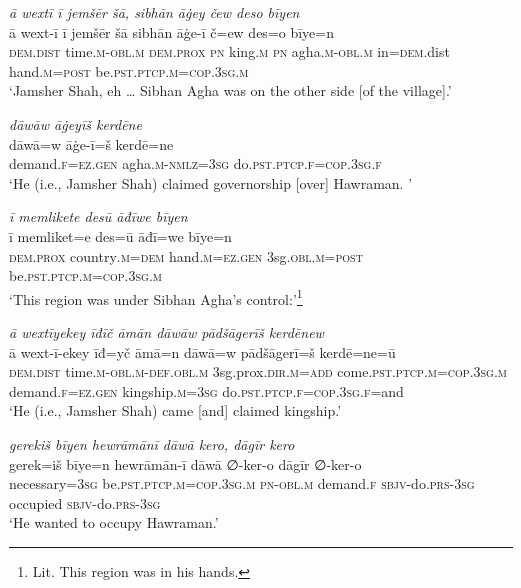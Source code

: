 \ea \label{DP.12}
\textit{ā wextī ī jemšēr šā, sibhān āġey čew deso bīyen} \\ 
\gll ā wext-ī ī jemšēr šā sibhān āġe-ī č=ew des=o bīye=n \\ 
 \textsc{dem.dist} time\textsc{.m}\textsc{-obl}\textsc{.m} \textsc{dem.prox} \textsc{pn} king\textsc{.m} \textsc{pn} agha\textsc{.m}\textsc{-obl}\textsc{.m} in\textsc{=dem}.dist hand\textsc{.m}\textsc{=\textsc{post}} be\textsc{.pst}\textsc{.ptcp}\textsc{.m}\textsc{=cop}\textsc{.3sg}\textsc{.m} \\ 
\glt `Jamsher Shah, eh … Sibhan Agha was on the other side [of the village].'
\z 
 
\ea \label{DP.13}
\textit{dāwāw āġeyīš kerdēne} \\ 
\gll dāwā=w āġe-ī=š kerdē=ne \\ 
 demand\textsc{\textsc{.f}}\textsc{=ez}\textsc{.gen} agha\textsc{.m}\textsc{-nmlz}\textsc{=3sg} do\textsc{.pst}\textsc{.ptcp}\textsc{\textsc{.f}}\textsc{=cop}\textsc{.3sg}\textsc{\textsc{.f}} \\ 
\glt `He (i.e., Jamsher Shah) claimed governorship [over] Hawraman. '
\z 
 
\ea \label{DP.14}
\textit{ī memlikete desū āđīwe bīyen} \\ 
\gll ī memliket=e des=ū āđī=we bīye=n \\ 
 \textsc{dem.prox} country\textsc{.m}\textsc{=dem} hand\textsc{.m}\textsc{=ez}\textsc{.gen} 3sg\textsc{.obl}\textsc{.m}\textsc{=\textsc{post}} be\textsc{.pst}\textsc{.ptcp}\textsc{.m}\textsc{=cop}\textsc{.3sg}\textsc{.m} \\ 
\glt `This region was under Sibhan Agha’s control:'\footnote{Lit. This region was in his hands.}
\z 
 
\ea \label{DP.17}
\textit{ā wextīyekey īđīč āmān dāwāw pādšāgerīš kerdēnew} \\ 
\gll ā wext-ī-ekey īđ=yč āmā=n dāwā=w pādšāgerī=š kerdē=ne=ū \\ 
 \textsc{dem.dist} time\textsc{.m}\textsc{-obl}\textsc{.m}\textsc{-def}\textsc{.obl}\textsc{.m} 3sg.prox\textsc{.dir}\textsc{.m}\textsc{=add} come\textsc{.pst}\textsc{.ptcp}\textsc{.m}\textsc{=cop}\textsc{.3sg}\textsc{.m} demand\textsc{\textsc{.f}}\textsc{=ez}\textsc{.gen} kingship\textsc{.m}\textsc{=3sg} do\textsc{.pst}\textsc{.ptcp}\textsc{\textsc{.f}}\textsc{=cop}\textsc{.3sg}\textsc{\textsc{.f}}=and \\ 
\glt `He (i.e., Jamsher Shah) came [and] claimed kingship.'
\z 
 
\ea \label{DP.18}
\textit{gerekiš bīyen hewrāmānī dāwā kero, dāgīr kero} \\ 
\gll gerek=iš bīye=n hewrāmān-ī dāwā ∅-ker-o dāgīr ∅-ker-o \\ 
 necessary\textsc{=3sg} be\textsc{.pst}\textsc{.ptcp}\textsc{.m}\textsc{=cop}\textsc{.3sg}\textsc{.m} \textsc{pn}\textsc{-obl}\textsc{.m} demand\textsc{\textsc{.f}} \textsc{sbjv-}do\textsc{.prs}\textsc{-3sg} occupied \textsc{sbjv-}do\textsc{.prs}\textsc{-3sg} \\ 
\glt `He wanted to occupy Hawraman.'
\z 
 
